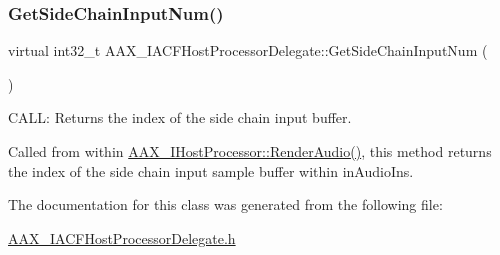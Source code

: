 \subsubsection{\texorpdfstring{GetSideChainInputNum()}{GetSideChainInputNum()}}
{\footnotesize\ttfamily virtual int32\+\_\+t A\+A\+X\+\_\+\+I\+A\+C\+F\+Host\+Processor\+Delegate\+::\+Get\+Side\+Chain\+Input\+Num (\begin{DoxyParamCaption}{ }\end{DoxyParamCaption})\hspace{0.3cm}{\ttfamily [pure virtual]}}



C\+A\+LL\+: Returns the index of the side chain input buffer. 

Called from within \mbox{\hyperlink{a01693_a29f1352c77cdcce8dbac4d32f1a88887}{A\+A\+X\+\_\+\+I\+Host\+Processor\+::\+Render\+Audio()}}, this method returns the index of the side chain input sample buffer within {\ttfamily in\+Audio\+Ins}. 

The documentation for this class was generated from the following file\+:\begin{DoxyCompactItemize}
\item 
\mbox{\hyperlink{a00539}{A\+A\+X\+\_\+\+I\+A\+C\+F\+Host\+Processor\+Delegate.\+h}}\end{DoxyCompactItemize}
